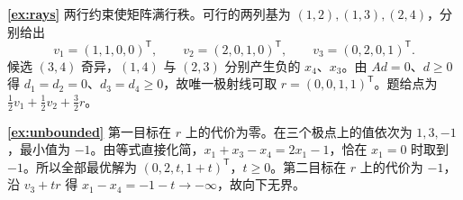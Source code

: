 \documentclass[UTF8,fontset=none,zihao=-4,a4paper]{ctexart}
\newcommand{\ans}[1]{\par\Needspace{3\baselineskip}\noindent\textbf{\ref{#1}}\quad}
\newcommand{\transpose}{^{\mathsf T}}
\begin{document}
\ans{ex:rays}
两行约束使矩阵满行秩。可行的两列基为 $(1,2),(1,3),(2,4)$，分别给出
\[
v_1=(1,1,0,0)\transpose,\qquad v_2=(2,0,1,0)\transpose,\qquad
v_3=(0,2,0,1)\transpose.
\]
候选 $(3,4)$ 奇异，$(1,4)$ 与 $(2,3)$ 分别产生负的 $x_4$、$x_3$。由 $Ad=0$、$d\ge0$ 得 $d_1=d_2=0$、$d_3=d_4\ge0$，故唯一极射线可取 $r=(0,0,1,1)\transpose$。题给点为 $\tfrac12v_1+\tfrac12v_2+\tfrac32r$。

\ans{ex:unbounded}
第一目标在 $r$ 上的代价为零。在三个极点上的值依次为 $1,3,-1$，最小值为 $-1$。由等式直接化简，$x_1+x_3-x_4=2x_1-1$，恰在 $x_1=0$ 时取到 $-1$。所以全部最优解为 $(0,2,t,1+t)\transpose$，$t\ge0$。第二目标在 $r$ 上的代价为 $-1$，沿 $v_3+tr$ 得 $x_1-x_4=-1-t\to-\infty$，故向下无界。
\end{document}
